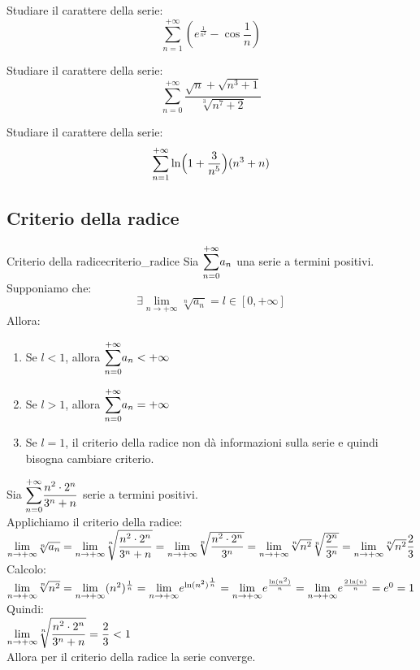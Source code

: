 \documentclass[12pt]{report}
\newcounter{theorem}
\newcommand{\nmu}{}
\begin{document}
		\begin{assignment}{}{}
			Studiare il carattere della serie:
			\[
			\sum_{n=1}^{+\infty}(e^\frac{1}{n^2} - \cos\frac{1}{n})
			\]
		\end{assignment}
		\begin{assignment}{}{}
			Studiare il carattere della serie:
			\[
			\sum_{n=0}^{+\infty}\dfrac{\sqrt{n} + \sqrt{n^3 + 1}}{\sqrt[3]{n^7 + 2}}
			\]
		\end{assignment}
		\begin{assignment}{}{}
			Studiare il carattere della serie:
			\[
			\sum_{n=1}^{+\infty}\ln\Bigl(1 + \frac{3}{n^5}\Bigr)(n^3 + n)
			\]
		\end{assignment}
		\subsection{Criterio della radice}

		\begin{theorem}{\nmu Criterio della radice}{criterio_radice}
			Sia $\mathlarger{\sum_{n=0}^{+\infty}}a_n$ una serie a termini positivi. \\
			Supponiamo che:
			\[
			\exists \lim_{n \to +\infty}\sqrt[n]{a_n} = l \in  [0, +\infty]
			\]
			Allora:
			\begin{enumerate}[label=(\arabic*)]
				\item Se $l < 1$, allora $\mathlarger{\sum_{n=0}^{+\infty}}a_n < +\infty$
				\item Se $l > 1$, allora $\mathlarger{\sum_{n=0}^{+\infty}}a_n = +\infty$
				\item Se $l=1$, il criterio della radice non dà informazioni sulla serie e quindi bisogna cambiare criterio.
			\end{enumerate}
		\end{theorem}

		\begin{example}{}{}
			Sia $\mathlarger{\sum_{n=0}^{+\infty}}\dfrac{n^2 \cdot 2^n}{3^n+n}$ serie a termini positivi. \\
			Applichiamo il criterio della radice: \\
			$\mathlarger{\lim_{n \to +\infty}}\sqrt[n]{a_n} = \mathlarger{\lim_{n \to +\infty}}\sqrt[n]{\dfrac{n^2\cdot2^n}{3^n + n}} = \mathlarger{\lim_{n \to +\infty}}\sqrt[n]{\dfrac{n^2\cdot2^n}{3^n}}=\mathlarger{\lim_{n \to +\infty}}\sqrt[n]{n^2}\sqrt[n]{\dfrac{2^n}{3^n}} = \mathlarger{\lim_{n \to +\infty}}\sqrt[n]{n^2}\dfrac{2}{3}$ \\
			Calcolo: \\
			$\mathlarger{\lim_{n \to +\infty}}\sqrt[n]{n^2} = \mathlarger{\lim_{n \to +\infty}}(n^2)^{\frac{1}{n}}=\mathlarger{\lim_{n \to +\infty}}e^{\ln(n^2)^{\frac{1}{n}}} = \mathlarger{\lim_{n \to +\infty}}e^{\frac{\ln(n^2)}{n}} = \mathlarger{\lim_{n \to +\infty}}e^{\frac{2\ln(n)}{n}} = e^0 = 1$ \\
			Quindi: \\
			$\mathlarger{\lim_{n \to +\infty}}\sqrt[n]{\dfrac{n^2\cdot2^n}{3^n + n}} = \dfrac{2}{3} < 1$ \\
			Allora per il criterio della radice la serie converge.
		\end{example}
\end{document}
